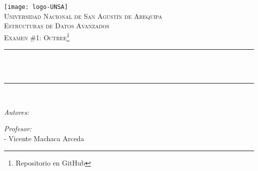 \begin{titlepage}

\centering
\texttt{[image: logo-UNSA]}\\[1.0 cm]
\textsc{\LARGE Universidad Nacional de San Agustín de Arequipa}\\[2.0 cm]
\textsc{\Large Estructuras de Datos Avanzados}\\[0.5 cm]
\textsc{\large Examen \#1: Octree\footnote{Repositorio en GitHub\cite{repo}}}\\[0.5 cm]
\rule{\linewidth}{0.2 mm} \\[0.4 cm]
{ \huge \bfseries \thetitle}\\
\rule{\linewidth}{0.2 mm} \\[1.5 cm]

\begin{flushleft} \large
  \emph{Autores:}\\
\theauthor
\end{flushleft}

\begin{flushleft} \large
  \emph{Profesor:}\\
  - Vicente Machaca Arceda \\
\end{flushleft}

\vfill

{\large \thedate}

\end{titlepage}

